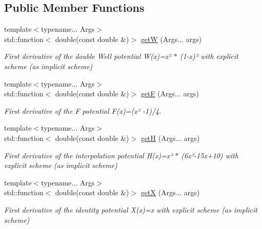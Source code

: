\subsection*{Public Member Functions}
\begin{DoxyCompactItemize}
\item 
{\footnotesize template$<$typename... Args$>$ }\\std\+::function$<$ double(const double \&)$>$ \hyperlink{structpotential__function_3_011_00_01ThermodynamicsPotentialDiscretization_1_1Explicit_01_4_a83b90abf5c35bfe033a38d32ad812db1}{getW} (Args... args)
\begin{DoxyCompactList}\small\item\em First derivative of the double Well potential W(x)=x² $\ast$ (1-\/x)² with explicit scheme (as implicit scheme) \end{DoxyCompactList}\item 
{\footnotesize template$<$typename... Args$>$ }\\std\+::function$<$ double(const double \&)$>$ \hyperlink{structpotential__function_3_011_00_01ThermodynamicsPotentialDiscretization_1_1Explicit_01_4_aa5b8fb0d4c1b1bc1661eff409466133a}{getF} (Args... args)
\begin{DoxyCompactList}\small\item\em First derivative of the F potential F(x)=(x² -\/1)/4. \end{DoxyCompactList}\item 
{\footnotesize template$<$typename... Args$>$ }\\std\+::function$<$ double(const double \&)$>$ \hyperlink{structpotential__function_3_011_00_01ThermodynamicsPotentialDiscretization_1_1Explicit_01_4_a7b08d20c38b06d405bc33d028ba6bad0}{getH} (Args... args)
\begin{DoxyCompactList}\small\item\em First derivative of the interpolation potential H(x)=x³ $\ast$ (6x²-\/15x+10) with explicit scheme (as implicit scheme) \end{DoxyCompactList}\item 
{\footnotesize template$<$typename... Args$>$ }\\std\+::function$<$ double(const double \&)$>$ \hyperlink{structpotential__function_3_011_00_01ThermodynamicsPotentialDiscretization_1_1Explicit_01_4_aaf5a701d015b3c450af251a86a2e66c2}{getX} (Args... args)
\begin{DoxyCompactList}\small\item\em First derivative of the identity potential X(x)=x with explicit scheme (as implicit scheme) \end{DoxyCompactList}\end{DoxyCompactItemize}


